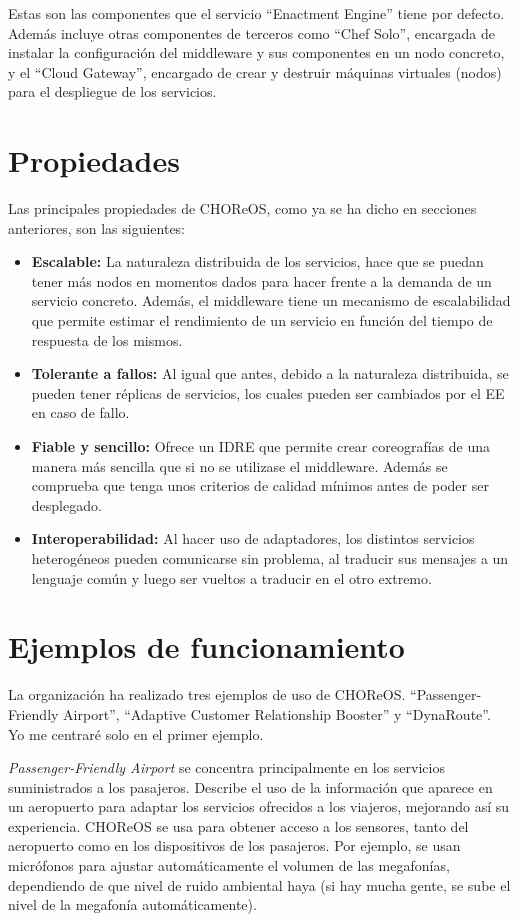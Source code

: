 \documentclass[runningheads]{llncs}
\begin{document}
Estas son las componentes que el servicio ``Enactment Engine'' tiene por defecto. Además incluye otras componentes de terceros como ``Chef Solo'', encargada de instalar la configuración del middleware y sus componentes en un nodo concreto, y el ``Cloud Gateway'', encargado de crear y destruir máquinas virtuales (nodos)~\cite{a_128} para el despliegue de los servicios.

\section{Propiedades}
Las principales propiedades de CHOReOS, como ya se ha dicho en secciones anteriores, son las siguientes:

\begin{itemize}
    \item \textbf{Escalable: }La naturaleza distribuida de los servicios, hace que se puedan tener más nodos en momentos dados para hacer frente a la demanda de un servicio concreto. Además, el middleware tiene un mecanismo de escalabilidad que permite estimar el rendimiento de un servicio en función del tiempo de respuesta de los mismos.
    \item \textbf{Tolerante a fallos: }Al igual que antes, debido a la naturaleza distribuida, se pueden tener réplicas de servicios, los cuales pueden ser cambiados por el EE en caso de fallo.
    \item \textbf{Fiable y sencillo: }Ofrece un IDRE que permite crear coreografías de una manera más sencilla que si no se utilizase el middleware. Además se comprueba que tenga unos criterios de calidad mínimos antes de poder ser desplegado.
    \item \textbf{Interoperabilidad: }Al hacer uso de adaptadores, los distintos servicios heterogéneos pueden comunicarse sin problema, al traducir sus mensajes a un lenguaje común y luego ser vueltos a traducir en el otro extremo.~\cite{a_2}
\end{itemize}
\section{Ejemplos de funcionamiento}
La organización ha realizado tres ejemplos de uso de CHOReOS. ``Passenger-Friendly Airport'', ``Adaptive Customer Relationship Booster'' y ``DynaRoute''.~\cite{a_2} Yo me centraré solo en el primer ejemplo.

\smallskip

\textit{Passenger-Friendly Airport} se concentra principalmente en los servicios suministrados a los pasajeros. Describe el uso de la información que aparece en un aeropuerto para adaptar los servicios ofrecidos a los viajeros, mejorando así su experiencia. CHOReOS se usa para obtener acceso a los sensores, tanto del aeropuerto como en los dispositivos de los pasajeros. Por ejemplo, se usan micrófonos para ajustar automáticamente el volumen de las megafonías, dependiendo de que nivel de ruido ambiental haya (si hay mucha gente, se sube el nivel de la megafonía automáticamente).~\cite{a_128}
\end{document}
